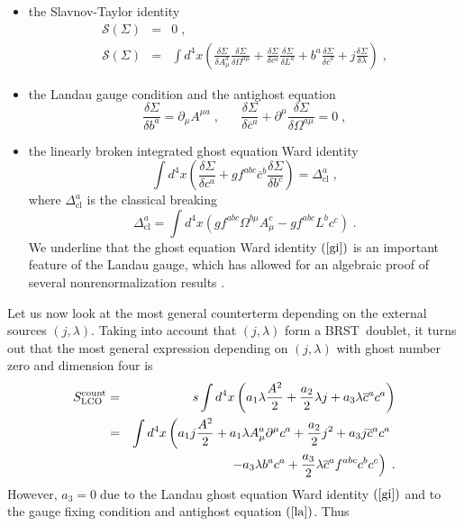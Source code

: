 \documentclass[a4paper,12pt]{article}
\begin{document}
\begin{itemize}
\item  the Slavnov-Taylor identity 
\begin{eqnarray}
\mathcal{S}(\Sigma ) &=&0\;,  \label{st} \\
\mathcal{S}(\Sigma ) &=&\int d^{4}x\left( \frac{\delta \Sigma }{\delta
A_{\mu }^{a}}\frac{\delta \Sigma }{\delta \Omega ^{a\mu }}+\frac{\delta
\Sigma }{\delta c^{a}}\frac{\delta \Sigma }{\delta L^{a}}+b^{a}\frac{\delta
\Sigma }{\delta \overline{c}^{a}}+j\frac{\delta \Sigma }{\delta \lambda }%
\right) \;,  \nonumber
\end{eqnarray}

\item  the Landau gauge condition and the antighost equation 
\begin{equation}
\frac{\delta \Sigma }{\delta b^{a}}=\partial _{\mu }A^{\mu a}\;,\;\;\;\;\;\;%
\frac{\delta \Sigma }{\delta \overline{c}^{a}}+\partial ^{\mu }\frac{\delta
\Sigma }{\delta \Omega ^{a\mu }}=0\;,  \label{la}
\end{equation}

\item  the linearly broken integrated ghost equation$\;$Ward identity 
\begin{equation}
\int d^{4}x\left( \frac{\delta \Sigma }{\delta c^{a}}+gf^{abc}\overline{c}%
^{b}\frac{\delta \Sigma }{\delta b^{c}}\right) =\Delta _{\mathrm{cl}}^{a}\;,
\label{gi}
\end{equation}
where $\Delta _{\mathrm{cl}}^{a}$ is the classical breaking 
\begin{equation}
\Delta _{\mathrm{cl}}^{a}=\int d^{4}x\left( gf^{abc}\Omega ^{b\mu }A_{\mu
}^{c}-gf^{abc}L^{b}c^{c}\right) \;.  \label{cb}
\end{equation}
We underline that the ghost equation Ward identity $\left( \ref{gi}\right) $
is an important feature of the Landau gauge, which has allowed for an
algebraic proof of several nonrenormalization results \cite{landau}.
\end{itemize}

Let us now look at the most general counterterm depending on the external
sources $\left( j,\lambda \right) .$ Taking into account that $\left(
j,\lambda \right) $ form a BRST\ doublet, it turns out that the most general
expression depending on $\left( j,\lambda \right) $ with ghost number zero
and dimension four is 
\begin{eqnarray}
S_{\mathrm{LCO}}^{\mathrm{count}} &=&s\int d^{4}x\left( a_{1}\lambda \frac{%
A^{2}}{2}+\frac{a_{2}}{2}\lambda j+a_{3}\lambda \overline{c}^{a}c^{a}\right)
\label{ct} \\
&=&\int d^{4}x\left( a_{1}j\frac{A^{2}}{2}+a_{1}\lambda A_{\mu }^{a}\partial
^{\mu }c^{a}+\frac{a_{2}}{2}j^{2}+a_{3}j\overline{c}^{a}c^{a}\;\right. 
\nonumber \\
&&\;\;\;\;\;\;\;\;\left. -a_{3}\lambda b^{a}c^{a}+\frac{a_{3}}{2}\lambda 
\overline{c}^{a}f^{abc}c^{b}c^{c}\right) \;.  \nonumber
\end{eqnarray}
However, $a_{3}=0\;$due to the Landau ghost equation Ward identity $\left( 
\ref{gi}\right) $ and to the gauge fixing condition and antighost equation $%
\left( \ref{la}\right) $. Thus
\end{document}

